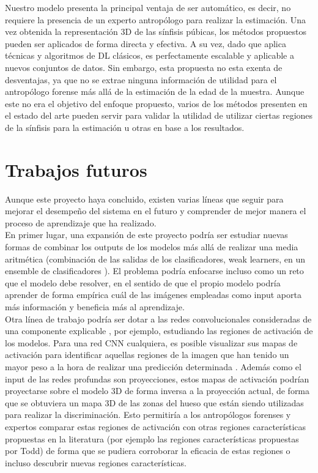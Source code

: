 Nuestro modelo presenta la principal ventaja de ser automático, es decir, no requiere la presencia de un experto antropólogo para realizar la estimación. Una vez obtenida la representación 3D de las sínfisis púbicas, los métodos propuestos pueden ser aplicados de forma directa y efectiva. A su vez, dado que aplica técnicas y algoritmos de DL clásicos, es perfectamente escalable y aplicable a nuevos conjuntos de datos. Sin embargo, esta propuesta no esta exenta de desventajas, ya que no se extrae ninguna información de utilidad para el antropólogo forense más allá de la estimación de la edad de la muestra. Aunque este no era el objetivo del enfoque propuesto, varios de los métodos presenten en el estado del arte pueden servir para validar la utilidad de utilizar ciertas regiones de la sínfisis para la estimación u otras en base a los resultados.

\section{Trabajos futuros}

Aunque este proyecto haya concluido, existen varias líneas que seguir para mejorar el desempeño del sistema en el futuro y comprender de mejor manera el proceso de aprendizaje que ha realizado.\\

En primer lugar, una expansión de este proyecto podría ser estudiar nuevas formas de combinar los outputs de los modelos más allá de realizar una media aritmética (combinación de las salidas de los clasificadores, weak learners, en un ensemble de clasificadores \cite{cao2020ensemble, ganaie2021ensemble}). El problema podría enfocarse incluso como un reto que el modelo debe resolver, en el sentido de que el propio modelo podría aprender de forma empírica cuál de las imágenes empleadas como input aporta más información y beneficia más al aprendizaje.\\

Otra línea de trabajo podría ser dotar a las redes convolucionales consideradas de una componente explicable \cite{arrieta2020explainable,angelov2020towards,choo2018visual}, por ejemplo, estudiando las regiones de activación de los modelos. Para una red CNN cualquiera, es posible visualizar sus mapas de activación para identificar aquellas regiones de la imagen que han tenido un mayor peso a la hora de realizar una predicción determinada \cite{selvaraju2017grad}. Además como el input de las redes profundas son proyecciones, estos mapas de activación podrían proyectarse sobre el modelo 3D de forma inversa a la proyección actual, de forma que se obtuviera un mapa 3D de las zonas del hueso que están siendo utilizadas para realizar la discriminación. Esto permitiría a los antropólogos forenses y expertos comparar estas regiones de activación con otras regiones características propuestas en la literatura (por ejemplo las regiones características propuestas por Todd) de forma que se pudiera corroborar la eficacia de estas regiones o incluso descubrir nuevas regiones características.
